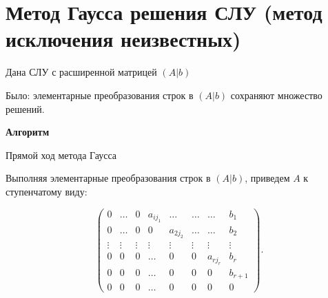 \section{Метод Гаусса решения СЛУ (метод исключения неизвестных)}

Дана СЛУ с расширенной матрицей $(A | b)$

Было: элементарные преобразования строк в $(A | b)$ сохраняют множество решений.

\textbf{Алгоритм} 

Прямой ход метода Гаусса

Выполняя элементарные преобразования строк в $(A | b)$, приведем $A$ к ступенчатому виду:

\begin{equation*}
    \begin{pmatrix} 
        0 & \dots & 0 & a_{ij_1} & \dots & \dots & \dots & b_1 \\
        0 & \dots & 0 & 0 & a_{2j_2} & \dots & \dots & b_2 \\
        \vdots & \vdots & \vdots & \vdots & \vdots & \vdots & \vdots & \vdots \\
        0 & 0 & 0 & \dots & 0 & 0 & a_{rj_r} & b_r \\
        0 & 0 & 0 & \dots & 0 & 0 & 0 & b_{r + 1} \\
        0 & 0 & 0 & \dots & 0 & 0 & 0 & 0
    \end{pmatrix} 
.\end{equation*}

